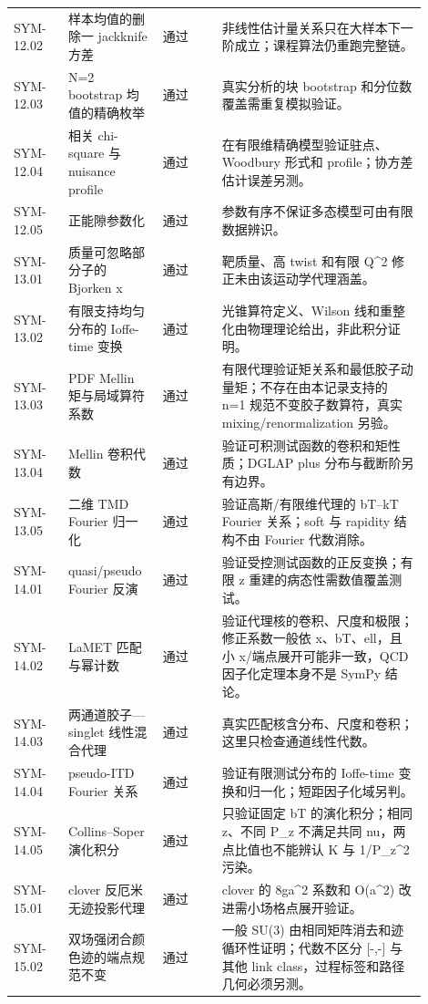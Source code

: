 \begin{longtable}{p{0.12\linewidth}p{0.20\linewidth}p{0.13\linewidth}p{0.45\linewidth}}
SYM-12.02 & 样本均值的删除一 jackknife 方差 & 通过 & 非线性估计量关系只在大样本下一阶成立；课程算法仍重跑完整链。\\
SYM-12.03 & N=2 bootstrap 均值的精确枚举 & 通过 & 真实分析的块 bootstrap 和分位数覆盖需重复模拟验证。\\
SYM-12.04 & 相关 chi-square 与 nuisance profile & 通过 & 在有限维精确模型验证驻点、Woodbury 形式和 profile；协方差估计误差另测。\\
SYM-12.05 & 正能隙参数化 & 通过 & 参数有序不保证多态模型可由有限数据辨识。\\
SYM-13.01 & 质量可忽略部分子的 Bjorken x & 通过 & 靶质量、高 twist 和有限 Q^2 修正未由该运动学代理涵盖。\\
SYM-13.02 & 有限支持均匀分布的 Ioffe-time 变换 & 通过 & 光锥算符定义、Wilson 线和重整化由物理理论给出，非此积分证明。\\
SYM-13.03 & PDF Mellin 矩与局域算符系数 & 通过 & 有限代理验证矩关系和最低胶子动量矩；不存在由本记录支持的 n=1 规范不变胶子数算符，真实 mixing/renormalization 另验。\\
SYM-13.04 & Mellin 卷积代数 & 通过 & 验证可积测试函数的卷积和矩性质；DGLAP plus 分布与截断阶另有边界。\\
SYM-13.05 & 二维 TMD Fourier 归一化 & 通过 & 验证高斯/有限维代理的 bT--kT Fourier 关系；soft 与 rapidity 结构不由 Fourier 代数消除。\\
SYM-14.01 & quasi/pseudo Fourier 反演 & 通过 & 验证受控测试函数的正反变换；有限 z 重建的病态性需数值覆盖测试。\\
SYM-14.02 & LaMET 匹配与幂计数 & 通过 & 验证代理核的卷积、尺度和极限；修正系数一般依 x、bT、ell，且小 x/端点展开可能非一致，QCD 因子化定理本身不是 SymPy 结论。\\
SYM-14.03 & 两通道胶子—singlet 线性混合代理 & 通过 & 真实匹配核含分布、尺度和卷积；这里只检查通道线性代数。\\
SYM-14.04 & pseudo-ITD Fourier 关系 & 通过 & 验证有限测试分布的 Ioffe-time 变换和归一化；短距因子化域另判。\\
SYM-14.05 & Collins--Soper 演化积分 & 通过 & 只验证固定 bT 的演化积分；相同 z、不同 P\_z 不满足共同 nu，两点比值也不能辨认 K 与 1/P\_z^2 污染。\\
SYM-15.01 & clover 反厄米无迹投影代理 & 通过 & clover 的 8ga^2 系数和 O(a^2) 改进需小场格点展开验证。\\
SYM-15.02 & 双场强闭合颜色迹的端点规范不变 & 通过 & 一般 SU(3) 由相同矩阵消去和迹循环性证明；代数不区分 [-,-] 与其他 link class，过程标签和路径几何必须另测。\\

\end{longtable}
